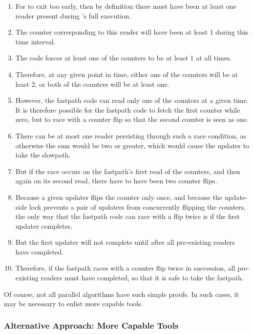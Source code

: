 \begin{enumerate}
\item	For  to exit too early, then
	by definition there must have been at least one reader
	present during 's full
	execution.
\item	The counter corresponding to this reader will have been
	at least 1 during this time interval.
\item	The  code forces at least one
	of the counters to be at least 1 at all times.
\item	Therefore, at any given point in time, either one of the
	counters will be at least 2, or both of the counters will
	be at least one.
\item	However, the  fastpath code
	can read only one of the counters at a given time.
	It is therefore possible for the fastpath code to fetch
	the first counter while zero, but to race with a counter
	flip so that the second counter is seen as one.
\item	There can be at most one reader persisting through such
	a race condition, as otherwise the sum would be two or
	greater, which would cause the updater to take the slowpath.
\item	But if the race occurs on the fastpath's first read of the
	counters, and then again on its second read, there have
	to have been two counter flips.
\item	Because a given updater flips the counter only once, and
	because the update-side lock prevents a pair of updaters
	from concurrently flipping the counters, the only way that
	the fastpath code can race with a flip twice is if the
	first updater completes.
\item	But the first updater will not complete until after all
	pre-existing readers have completed.
\item	Therefore, if the fastpath races with a counter flip
	twice in succession, all pre-existing readers must have
	completed, so that it is safe to take the fastpath.
\end{enumerate}

Of course, not all parallel algorithms have such simple proofs.
In such cases, it may be necessary to enlist more capable tools.

\subsubsection{Alternative Approach: More Capable Tools}
\label{sec:formal:Alternative Approach: More Capable Tools}

